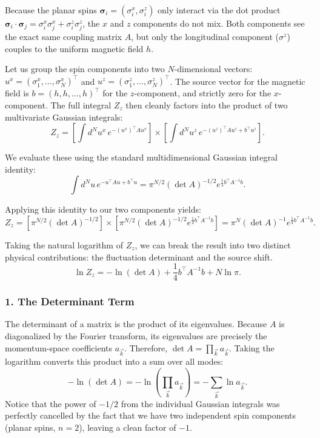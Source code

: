 \documentclass[11pt,a4paper]{article}
\newcommand{\bk}{\vec k}
\newcommand{\bk}{\vec k}
\begin{document}
Because the planar spins $\bm{\sigma}_i = (\sigma_i^x, \sigma_i^z)$ only interact via the dot product $\bm{\sigma}_i \cdot \bm{\sigma}_j = \sigma_i^x \sigma_j^x + \sigma_i^z \sigma_j^z$, the $x$ and $z$ components do not mix. Both components see the exact same coupling matrix $A$, but only the longitudinal component ($\sigma^z$) couples to the uniform magnetic field $h$. 

Let us group the spin components into two $N$-dimensional vectors: $u^x = (\sigma_1^x, \dots, \sigma_N^x)^\top$ and $u^z = (\sigma_1^z, \dots, \sigma_N^z)^\top$. The source vector for the magnetic field is $b = (h, h, \dots, h)^\top$ for the $z$-component, and strictly zero for the $x$-component. The full integral $Z_z$ then cleanly factors into the product of two multivariate Gaussian integrals:
\begin{equation}
  Z_z = \left[ \int d^N u^x \, e^{-(u^x)^\top A u^x} \right] \times \left[ \int d^N u^z \, e^{-(u^z)^\top A u^z + b^\top u^z} \right].
\end{equation}

We evaluate these using the standard multidimensional Gaussian integral identity:
\begin{equation}
  \int d^N u \, e^{-u^\top A u + b^\top u} = \pi^{N/2}(\det A)^{-1/2} e^{\frac{1}{4} b^\top A^{-1} b}.
\end{equation}

Applying this identity to our two components yields:
\begin{equation}
  Z_z = \left[ \pi^{N/2}(\det A)^{-1/2} \right] \times \left[ \pi^{N/2}(\det A)^{-1/2} e^{\frac{1}{4} b^\top A^{-1} b} \right] = \pi^N (\det A)^{-1} e^{\frac{1}{4} b^\top A^{-1} b}.
\end{equation}

Taking the natural logarithm of $Z_z$, we can break the result into two distinct physical contributions: the fluctuation determinant and the source shift.
\begin{equation}
  \ln Z_z = -\ln(\det A) + \frac{1}{4} b^\top A^{-1} b + N\ln\pi.
\end{equation}

\subsubsection*{1. The Determinant Term}
The determinant of a matrix is the product of its eigenvalues. Because $A$ is diagonalized by the Fourier transform, its eigenvalues are precisely the momentum-space coefficients $a_{\bk}$. Therefore, $\det A = \prod_{\bk} a_{\bk}$. Taking the logarithm converts this product into a sum over all modes:
\begin{equation}
  -\ln(\det A) = -\ln \left( \prod_{\bk} a_{\bk} \right) = -\sum_{\bk} \ln a_{\bk}.
\end{equation}
Notice that the power of $-1/2$ from the individual Gaussian integrals was perfectly cancelled by the fact that we have two independent spin components (planar spins, $n=2$), leaving a clean factor of $-1$.
\end{document}

